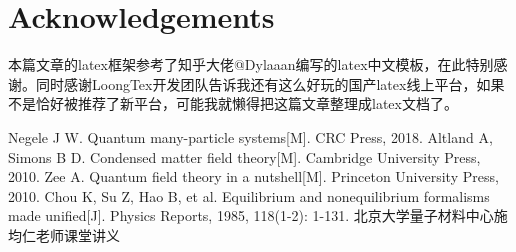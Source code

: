 \documentclass[12pt, a4paper, oneside]{ctexart}
\begin{document}
\newpage

\section*{Acknowledgements}
本篇文章的latex框架参考了知乎大佬@Dylaaan编写的latex中文模板，在此特别感谢。同时感谢LoongTex开发团队告诉我还有这么好玩的国产latex线上平台，如果不是恰好被推荐了新平台，可能我就懒得把这篇文章整理成latex文档了。
\newpage

\begin{thebibliography}{99}
    Negele J W. Quantum many-particle systems[M]. CRC Press, 2018.
    Altland A, Simons B D. Condensed matter field theory[M]. Cambridge University Press, 2010.
    Zee A. Quantum field theory in a nutshell[M]. Princeton University Press, 2010.
    Chou K, Su Z, Hao B, et al. Equilibrium and nonequilibrium formalisms made unified[J]. Physics Reports, 1985, 118(1-2): 1-131.
    北京大学量子材料中心施均仁老师课堂讲义
\end{thebibliography}

\newpage
\end{document}
